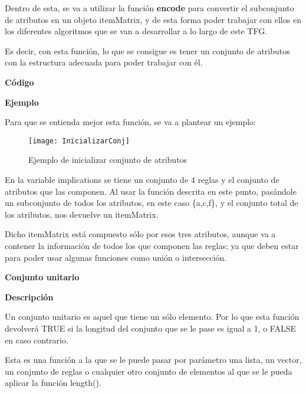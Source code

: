     Dentro de esta, se va a utilizar la funci\'on \textbf{encode} para convertir el subconjunto de atributos en un objeto itemMatrix, y de esta 
    forma poder trabajar con ellos en los diferentes algoritmos que se van a desarrollar a lo largo de este TFG.

    Es decir, con esta funci\'on, lo que se consigue es tener un conjunto de atributos con la estructura adecuada para poder trabajar con \'el.
    \\

    \bigskip
    
    \textbf{C\'odigo}
    
    
    \clearpage
    
    \textbf{Ejemplo}

    Para que se entienda mejor esta funci\'on, se va a plantear un ejemplo:

    \begin{figure}[H]
        \centering
        \texttt{[image: InicializarConj]}
        \caption{Ejemplo de inicializar conjunto de atributos}
        \label{fig:InicializarConj}
    \end{figure}

    En la variable implications se tiene un conjunto de 4 reglas y el conjunto de atributos que las componen.
    Al usar la funci\'on descrita en este punto, pas\'andole un subconjunto de todos los atributos, en este caso \{a,c,f\}, y 
    el conjunto total de los atributos, nos devuelve un itemMatrix. 
    
    Dicho itemMatrix est\'a compuesto s\'olo por esos tres atributos, aunque va a contener la informaci\'on de todos los que 
    componen las reglas; ya que deben estar para poder usar algunas funciones como uni\'on o intersecci\'on.
    \\

\clearpage

\textbf{ \large Conjunto unitario}

\smallskip

    \textbf{Descripci\'on}
    
    Un conjunto unitario es aquel que tiene un s\'olo elemento. Por lo que esta funci\'on 
    devolver\'a TRUE si la longitud del conjunto que se le pase es igual a 1, o FALSE en caso 
    contrario.

    Esta es una funci\'on a la que se le puede pasar por par\'ametro una lista, un vector, 
    un conjunto de reglas o cualquier otro conjunto de elementos al que se le pueda aplicar la funci\'on 
    length().
    \\


